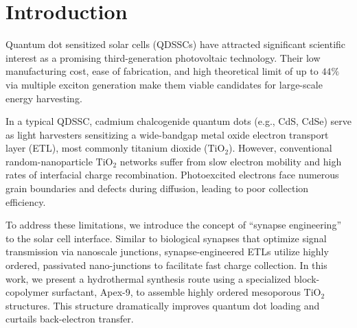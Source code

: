 \section{Introduction}
Quantum dot sensitized solar cells (QDSSCs) have attracted significant scientific interest as a promising third-generation photovoltaic technology. Their low manufacturing cost, ease of fabrication, and high theoretical limit of up to $44\%$ via multiple exciton generation make them viable candidates for large-scale energy harvesting. 

In a typical QDSSC, cadmium chalcogenide quantum dots (e.g., CdS, CdSe) serve as light harvesters sensitizing a wide-bandgap metal oxide electron transport layer (ETL), most commonly titanium dioxide ($\text{TiO}_2$). However, conventional random-nanoparticle $\text{TiO}_2$ networks suffer from slow electron mobility and high rates of interfacial charge recombination. Photoexcited electrons face numerous grain boundaries and defects during diffusion, leading to poor collection efficiency.

To address these limitations, we introduce the concept of ``synapse engineering'' to the solar cell interface. Similar to biological synapses that optimize signal transmission via nanoscale junctions, synapse-engineered ETLs utilize highly ordered, passivated nano-junctions to facilitate fast charge collection. In this work, we present a hydrothermal synthesis route using a specialized block-copolymer surfactant, Apex-9, to assemble highly ordered mesoporous $\text{TiO}_2$ structures. This structure dramatically improves quantum dot loading and curtails back-electron transfer.

